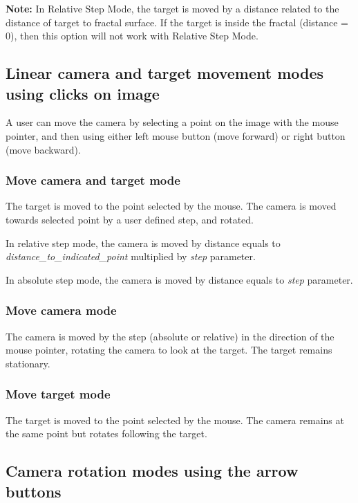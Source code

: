 \textbf{Note:} In Relative Step Mode, the target is moved by a distance related to the distance of target to fractal surface. If the target is inside the fractal (distance = 0), then this option will not work with Relative Step Mode.

\subsection{Linear camera and target movement modes using clicks on image}\label{linear-camera-and-target-movement-modes-using-the-mouse-pointer}

A user can move the camera by selecting a point on the image with the mouse pointer, and then using either left mouse button (move forward) or right button (move backward).


\subsubsection{Move camera and target mode}\label{move-camera-and-target-mode-1}

The target is moved to the point selected by the mouse. The camera is moved towards selected point by a user defined step, and rotated.

In relative step mode, the camera is moved by distance equals to
\emph{distance\_to\_indicated\_point} multiplied by \emph{step} parameter.

In absolute step mode, the camera is moved by distance equals to \emph{step}
parameter.

\subsubsection{Move camera mode}\label{move-camera-mode-1}

The camera is moved by the step (absolute or relative) in the direction of the
mouse pointer, rotating the camera to look at the target. The target remains
stationary.

\subsubsection{Move target mode}\label{move-target-mode-1}

The target is moved to the point selected by the mouse. The camera remains at
the same point but rotates following the target.

\subsection{Camera rotation modes using the arrow
	buttons}\label{camera-rotation-modes-using-the-arrow-buttons}

